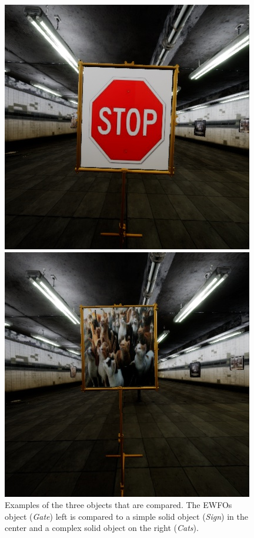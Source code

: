 \begin{figure}[hbtp]
\begin{minipage}{0.3\textwidth}
		\includegraphics[width=\textwidth]{fig/sign}
	\end{minipage}
	\begin{minipage}{0.3\textwidth}
		\includegraphics[width=\textwidth]{fig/cats}
	\end{minipage}
	\caption{Examples of the three objects that are compared. The \acp{EWFO} object (\textit{Gate}) left is compared to a simple solid object (\textit{Sign}) in the center and a complex solid object on the right (\textit{Cats}).}
	\label{fig:cats}
\end{figure}

